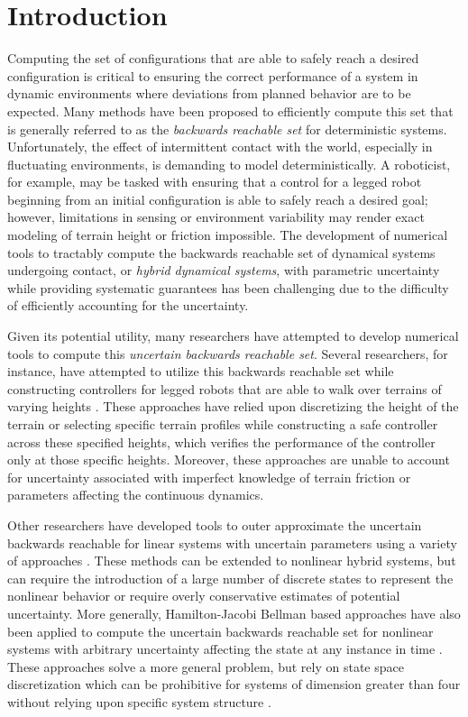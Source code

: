\section{Introduction}

Computing the set of configurations that are able to safely reach a desired configuration is critical to ensuring the correct performance of a system in dynamic environments where deviations from planned behavior are to be expected.
Many methods have been proposed to efficiently compute this set that is generally referred to as the \emph{backwards reachable set} for deterministic systems.
Unfortunately, the effect of intermittent contact with the world, especially in fluctuating environments, is demanding to model deterministically.
A roboticist, for example, may be tasked with ensuring that a control for a legged robot beginning from an initial configuration is able to safely reach a desired goal; however, limitations in sensing or environment variability may render exact modeling of terrain height or friction impossible.
The development of numerical tools to tractably compute the backwards reachable set of dynamical systems undergoing contact, or \emph{hybrid dynamical systems}, with parametric uncertainty while providing systematic guarantees has been challenging due to the difficulty of efficiently accounting for the uncertainty.

Given its potential utility, many researchers have attempted to develop numerical tools to compute this \emph{uncertain backwards reachable set}.
Several researchers, for instance, have attempted to utilize this backwards reachable set while constructing controllers for legged robots that are able to walk over terrains of varying heights \cite{byl2008metastable,dai2012optimizing,griffin2015,saglam2013switching}.
These approaches have relied upon discretizing the height of the terrain or selecting specific terrain profiles while constructing a safe controller across these specified heights, which verifies the performance of the controller only at those specific heights.
Moreover, these approaches are unable to account for uncertainty associated with imperfect knowledge of terrain friction or parameters affecting the continuous dynamics.

Other researchers have developed tools to outer approximate the uncertain backwards reachable for linear systems with uncertain parameters using a variety of approaches \cite{girard2005reachability,althoff2008reachability}.
These methods can be extended to nonlinear hybrid systems, but can require the introduction of a large number of discrete states to represent the nonlinear behavior or require overly conservative estimates of potential uncertainty.
More generally, Hamilton-Jacobi Bellman based approaches have also been applied to compute the uncertain backwards reachable set for nonlinear systems with arbitrary uncertainty affecting the state at any instance in time \cite{tomlin2003computational}.
These approaches solve a more general problem, but rely on state space discretization which can be prohibitive for systems of dimension greater than four without relying upon specific system structure \cite{maidens2013lagrangian}.


